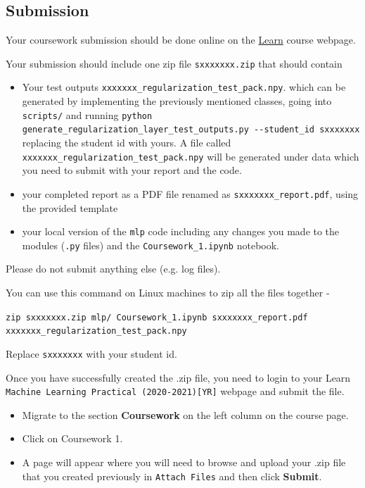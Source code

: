 \documentclass[11pt,]{article}
\begin{document}
\subsection{Submission}
\label{sec:submission}

Your coursework submission should be done online on the \href{https://www.learn.ed.ac.uk/}{Learn} course webpage.

Your submission should include one zip file \texttt{sxxxxxxx.zip} that should contain

\begin{itemize}

\item Your test outputs \texttt{xxxxxxx\_regularization\_test\_pack.npy}. which can be generated by implementing the previously mentioned classes, going into \texttt{scripts/} and running \texttt{python generate\_regularization\_layer\_test\_outputs.py -{}-student\_id sxxxxxxx} replacing the student id with yours. A file called \texttt{xxxxxxx\_regularization\_test\_pack.npy} will be generated under data which you need to submit with your report and the code.
\item
  your completed report as a PDF file renamed as \texttt{sxxxxxxx\_report.pdf}, using the provided template
\item
  your local version of the \texttt{mlp} code including any changes
  you made to the modules (\texttt{.py} files) and the \texttt{Coursework\_1.ipynb} notebook.   
\end{itemize}
Please do not submit anything else (e.g. log files).

You can use this command on Linux machines to zip all the files together - 

\texttt{zip sxxxxxxx.zip mlp/  \texttt{Coursework\_1.ipynb} sxxxxxxx\_report.pdf \\ xxxxxxx\_regularization\_test\_pack.npy}

Replace \texttt{sxxxxxxx} with your student id. 

Once you have successfully created the .zip file, you need to login to your Learn \texttt{Machine Learning Practical (2020-2021)[YR]} webpage and submit the file. 
\begin{itemize}
    \item Migrate to the section \textbf{Coursework} on the left column on the course page. 
    \item Click on Coursework 1.%
    \item A page will appear where you will need to browse and upload your .zip file that you created previously in \texttt{Attach Files} and then click \textbf{Submit}. 
\end{itemize}
\end{document}
